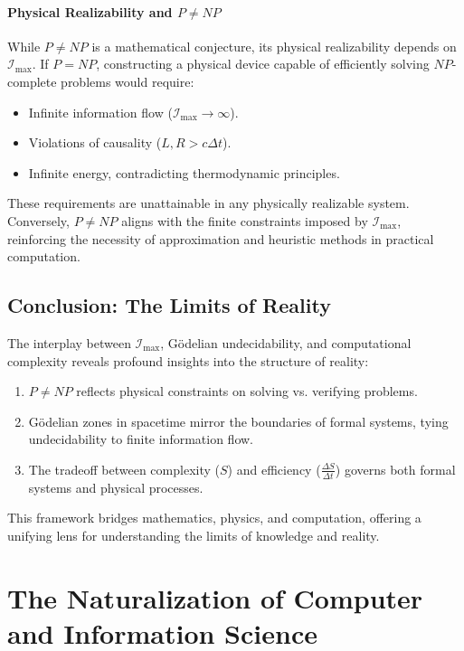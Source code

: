 \documentclass[12pt]{article}
\begin{document}
\paragraph{Physical Realizability and \(P \neq NP\)}
While \(P \neq NP\) is a mathematical conjecture, its physical realizability depends on \(\mathcal{I}_{\text{max}}\). If \(P = NP\), constructing a physical device capable of efficiently solving \(NP\)-complete problems would require:
\begin{itemize}
    \item Infinite information flow (\(\mathcal{I}_{\text{max}} \to \infty\)).
    \item Violations of causality (\(L, R > c\Delta t\)).
    \item Infinite energy, contradicting thermodynamic principles.
\end{itemize}
These requirements are unattainable in any physically realizable system. Conversely, \(P \neq NP\) aligns with the finite constraints imposed by \(\mathcal{I}_{\text{max}}\), reinforcing the necessity of approximation and heuristic methods in practical computation.


\subsection{Conclusion: The Limits of Reality}

The interplay between \(\mathcal{I}_{\text{max}}\), Gödelian undecidability, and computational complexity reveals profound insights into the structure of reality:
\begin{enumerate}
    \item \(P \neq NP\) reflects physical constraints on solving vs. verifying problems.
    \item Gödelian zones in spacetime mirror the boundaries of formal systems, tying undecidability to finite information flow.
    \item The tradeoff between complexity (\(S\)) and efficiency (\(\frac{\Delta S}{\Delta t}\)) governs both formal systems and physical processes.
\end{enumerate}

This framework bridges mathematics, physics, and computation, offering a unifying lens for understanding the limits of knowledge and reality.


\section{The Naturalization of Computer and Information Science}
\end{document}
